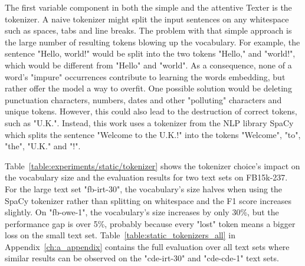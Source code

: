 The first variable component in both the simple and the attentive Texter is the tokenizer. A naive tokenizer might split the input sentences on any whitespace such as spaces, tabs and line breaks. The problem with that simple approach is the large number of resulting tokens blowing up the vocabulary. For example, the sentence "Hello, world!" would be split into the two tokens "Hello," and "world!", which would be different from "Hello" and "world". As a consequence, none of a word's "impure" occurrences contribute to learning the words embedding, but rather offer the model a way to overfit. One possible solution would be deleting punctuation characters, numbers, dates and other "polluting" characters and unique tokens. However, this could also lead to the destruction of correct tokens, such as "U.K.". Instead, this work uses a tokenizer from the NLP library SpaCy \cite{SpaCy} which splits the sentence "Welcome to the U.K.!" into the tokens "Welcome", "to", "the", "U.K." and "!".

%    

Table~\ref{table:experiments/static/tokenizer} shows the tokenizer choice's impact on the vocabulary size and the evaluation results for two text sets on FB15k-237. For the large text set "fb-irt-30", the vocabulary's size halves when using the SpaCy tokenizer rather than splitting on whitespace and the F1 score increases slightly. On "fb-owe-1", the vocabulary's size increases by only 30\%, but the performance gap is over 5\%, probably because every "lost" token means a bigger loss on the small text set. Table~\ref{table:static_tokenizers_all} in Appendix~\ref{ch:a_appendix} contains the full evaluation over all text sets where similar results can be observed on the "cde-irt-30" and "cde-cde-1" text sets.
